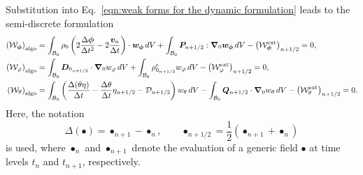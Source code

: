 Substitution into Eq.~\eqref{eqn:weak forms for the dynamic formulation} leads to the semi-discrete formulation
%
\begin{equation}
	\label{eqn:weak forms for proposed time integrator}
	\begin{aligned}
		\left(\mathcal{W}_{\boldsymbol{\phi}}\right)_{\text{algo}} &=
		\int_{\mathcal{B}_0}\rho_0 
		\left(
		2\frac{\Delta \boldsymbol{\phi}}{\Delta t^2} - 2\frac{\boldsymbol{v}_n}{\Delta t}
		\right)\cdot\boldsymbol{w}_{\boldsymbol{\phi}}\,dV 
		+ \int_{\mathcal{B}_0}\boldsymbol{P}_{n+1/2}:\boldsymbol{\nabla}_0\boldsymbol{w}_{\boldsymbol{\phi}}\,dV 
		- \left(\mathcal{W}^{\text{ext}}_{\boldsymbol{\phi}}\right)_{n+1/2} = 0, \\
		\left(\mathcal{W}_{\varphi}\right)_{\text{algo}} &=
		\int_{\mathcal{B}_0}\boldsymbol{D}_{0_{n+1/2}}\cdot\boldsymbol{\nabla}_0 w_{\varphi}\,dV 
		+ \int_{\mathcal{B}_0}\rho^{e}_{0_{n+1/2}} w_{\varphi}\,dV 
		- \left(\mathcal{W}_{\varphi}^{\text{ext}}\right)_{n+1/2} = 0, \\
		\left(\mathcal{W}_{\theta}\right)_{\text{algo}} &=
		\int_{\mathcal{B}_0}
		\left(
		\frac{\Delta(\theta\eta)}{\Delta t}
		- \frac{\Delta \theta}{\Delta t}\eta_{n+1/2}
		- \mathcal{D}_{n+1/2}
		\right) w_{\theta}\,dV 
		- \int_{\mathcal{B}_0}\boldsymbol{Q}_{n+1/2}\cdot\boldsymbol{\nabla}_0 w_{\theta}\,dV 
		- \left(\mathcal{W}_{\theta}^{\text{ext}}\right)_{n+1/2} = 0.
	\end{aligned}
\end{equation}
%
Here, the notation
%
\begin{equation*}
	\Delta(\bullet) = \bullet_{n+1} - \bullet_n,
	\qquad 
	\bullet_{n+1/2} = \frac{1}{2}\left(\bullet_{n+1} + \bullet_n\right)
\end{equation*}
%
is used, where $\bullet_n$ and $\bullet_{n+1}$ denote the evaluation of a generic field $\bullet$ at time levels $t_n$ and $t_{n+1}$, respectively.